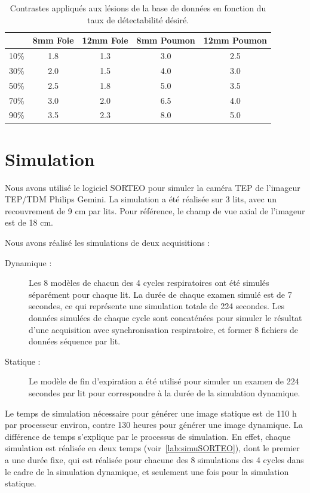 \begin{table}

\centering

\begin{tabular}{|c||c|c||c|c|}
 \hline
	& 8mm Foie	& 12mm Foie	& 8mm Poumon	& 12mm Poumon	\\
\hline
10\%	& 1.8		& 1.3		& 3.0		& 2.5		\\
\hline
30\%	& 2.0		& 1.5		& 4.0		& 3.0		\\
\hline
50\%	& 2.5		& 1.8		& 5.0		& 3.5		\\
\hline
70\%	& 3.0		& 2.0		& 6.5		& 4.0		\\
\hline
90\%	& 3.5		& 2.3		& 8.0		& 5.0		\\
\hline
\end{tabular}
\caption[Contraste final des lésions du foie et du poumon]{Contrastes appliqués aux lésions de la base de données en fonction du taux de détectabilité désiré.}
\label{tab:contrasteFoieFinal}
\end{table}

\section{Simulation}

Nous avons utilisé le logiciel SORTEO pour simuler la caméra TEP de l'imageur TEP/TDM Philips Gemini. La simulation a été réalisée sur 3 lits, avec un recouvrement de 9 cm par lits. Pour référence, le champ de vue axial de l'imageur est de 18 cm.

Nous avons réalisé les simulations de deux acquisitions :
\begin{description}
\item[Dynamique :] Les 8 modèles de chacun des 4 cycles respiratoires ont été simulés séparément pour chaque lit. La durée de chaque examen simulé est de 7 secondes, ce qui représente une simulation totale de 224 secondes. Les données simulées de chaque cycle sont concaténées pour simuler le résultat d'une acquisition avec synchronisation respiratoire, et former 8 fichiers de données séquence par lit.
\item[Statique :] Le modèle de fin d'expiration a été utilisé pour simuler un examen de 224 secondes par lit pour correspondre à la durée de la simulation dynamique.
\end{description}

Le temps de simulation nécessaire pour générer une image statique est de 110 h par processeur environ, contre 130 heures pour générer une image dynamique. La différence de temps s'explique par le processus de simulation. En effet, chaque simulation est réalisée en deux temps (voir~\ref{lab:simuSORTEO}), dont le premier a une durée fixe, qui est réalisée pour chacune des 8 simulations des 4 cycles dans le cadre de la simulation dynamique, et seulement une fois pour la simulation statique.

